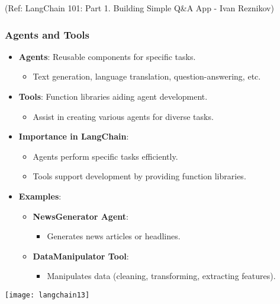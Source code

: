 \begin{frame}[fragile]
			{\tiny (Ref: LangChain 101: Part 1. Building Simple Q\&A App - Ivan Reznikov)}
			
		

\end{frame}

\begin{frame}[fragile]\frametitle{Agents and Tools}

      \begin{itemize}
        \item \textbf{Agents}: Reusable components for specific tasks.
          \begin{itemize}
            \item Text generation, language translation, question-answering, etc.
          \end{itemize}
        \item \textbf{Tools}: Function libraries aiding agent development.
          \begin{itemize}
            \item Assist in creating various agents for diverse tasks.
          \end{itemize}
        \item \textbf{Importance in LangChain}:
          \begin{itemize}
            \item Agents perform specific tasks efficiently.
            \item Tools support development by providing function libraries.
          \end{itemize}
        \item \textbf{Examples}:
          \begin{itemize}
            \item \textbf{NewsGenerator Agent}:
              \begin{itemize}
                \item Generates news articles or headlines.
              \end{itemize}
            \item \textbf{DataManipulator Tool}:
              \begin{itemize}
                \item Manipulates data (cleaning, transforming, extracting features).
              \end{itemize}
          \end{itemize}
      \end{itemize}		  
			\begin{center}
			\texttt{[image: langchain13]}
			\end{center}	  



\end{frame}
